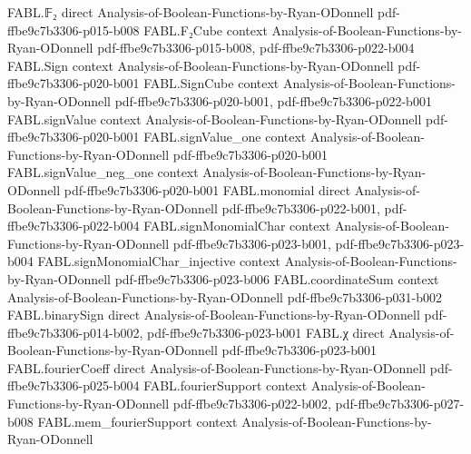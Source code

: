 \begin{theorem}
\label{FABL.eval_orderedMajorityThreeTree}
\leanok
{}
\proofstep
  {FABL.𝔽₂}
  {direct}
  {Analysis-of-Boolean-Functions-by-Ryan-ODonnell}
  {pdf-ffbe9c7b3306-p015-b008}
\proofstep
  {FABL.F₂Cube}
  {context}
  {Analysis-of-Boolean-Functions-by-Ryan-ODonnell}
  {pdf-ffbe9c7b3306-p015-b008,
    pdf-ffbe9c7b3306-p022-b004}
\proofstep
  {FABL.Sign}
  {context}
  {Analysis-of-Boolean-Functions-by-Ryan-ODonnell}
  {pdf-ffbe9c7b3306-p020-b001}
\proofstep
  {FABL.SignCube}
  {context}
  {Analysis-of-Boolean-Functions-by-Ryan-ODonnell}
  {pdf-ffbe9c7b3306-p020-b001,
    pdf-ffbe9c7b3306-p022-b001}
\proofstep
  {FABL.signValue}
  {context}
  {Analysis-of-Boolean-Functions-by-Ryan-ODonnell}
  {pdf-ffbe9c7b3306-p020-b001}
\proofstep
  {FABL.signValue_one}
  {context}
  {Analysis-of-Boolean-Functions-by-Ryan-ODonnell}
  {pdf-ffbe9c7b3306-p020-b001}
\proofstep
  {FABL.signValue_neg_one}
  {context}
  {Analysis-of-Boolean-Functions-by-Ryan-ODonnell}
  {pdf-ffbe9c7b3306-p020-b001}
\proofstep
  {FABL.monomial}
  {direct}
  {Analysis-of-Boolean-Functions-by-Ryan-ODonnell}
  {pdf-ffbe9c7b3306-p022-b001,
    pdf-ffbe9c7b3306-p022-b004}
\proofstep
  {FABL.signMonomialChar}
  {context}
  {Analysis-of-Boolean-Functions-by-Ryan-ODonnell}
  {pdf-ffbe9c7b3306-p023-b001,
    pdf-ffbe9c7b3306-p023-b004}
\proofstep
  {FABL.signMonomialChar_injective}
  {context}
  {Analysis-of-Boolean-Functions-by-Ryan-ODonnell}
  {pdf-ffbe9c7b3306-p023-b006}
\proofstep
  {FABL.coordinateSum}
  {context}
  {Analysis-of-Boolean-Functions-by-Ryan-ODonnell}
  {pdf-ffbe9c7b3306-p031-b002}
\proofstep
  {FABL.binarySign}
  {direct}
  {Analysis-of-Boolean-Functions-by-Ryan-ODonnell}
  {pdf-ffbe9c7b3306-p014-b002,
    pdf-ffbe9c7b3306-p023-b001}
\proofstep
  {FABL.χ}
  {direct}
  {Analysis-of-Boolean-Functions-by-Ryan-ODonnell}
  {pdf-ffbe9c7b3306-p023-b001}
\proofstep
  {FABL.fourierCoeff}
  {direct}
  {Analysis-of-Boolean-Functions-by-Ryan-ODonnell}
  {pdf-ffbe9c7b3306-p025-b004}
\proofstep
  {FABL.fourierSupport}
  {context}
  {Analysis-of-Boolean-Functions-by-Ryan-ODonnell}
  {pdf-ffbe9c7b3306-p022-b002,
    pdf-ffbe9c7b3306-p027-b008}
\proofstep
  {FABL.mem_fourierSupport}
  {context}
  {Analysis-of-Boolean-Functions-by-Ryan-ODonnell}

\end{theorem}
